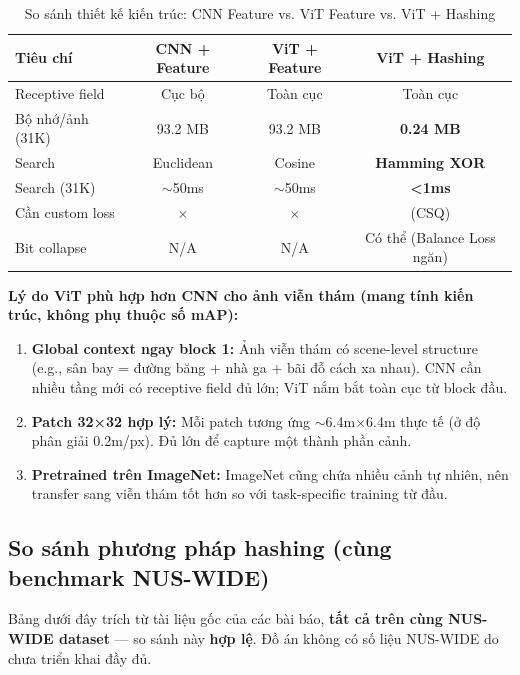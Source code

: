 \documentclass[13pt,a4paper]{article}
\newcommand{\tmark}{\checkmark}
\newcommand{\xmark}{$\times$}
\begin{document}
\begin{table}[H]
\centering
\caption{So sánh thiết kế kiến trúc: CNN Feature vs. ViT Feature vs. ViT + Hashing}
\label{tab:arch_comparison}
\begin{tabular}{lccc}
\toprule
\textbf{Tiêu chí} & \textbf{CNN + Feature} & \textbf{ViT + Feature} & \textbf{ViT + Hashing} \\
\midrule
Receptive field     & Cục bộ      & Toàn cục    & Toàn cục \\
Bộ nhớ/ảnh (31K)   & 93.2 MB     & 93.2 MB     & \textbf{0.24 MB} \\
Search             & Euclidean   & Cosine      & \textbf{Hamming XOR} \\
Search (31K)       & $\sim$50ms  & $\sim$50ms  & \textbf{<1ms} \\
Cần custom loss    & \xmark      & \xmark      & \tmark (CSQ) \\
Bit collapse       & N/A         & N/A         & Có thể (Balance Loss ngăn) \\
\bottomrule
\end{tabular}
\end{table}

\textbf{Lý do ViT phù hợp hơn CNN cho ảnh viễn thám (mang tính kiến trúc, không phụ thuộc số mAP):}
\begin{enumerate}
    \item \textbf{Global context ngay block 1:} Ảnh viễn thám có scene-level structure (e.g., sân bay = đường băng + nhà ga + bãi đỗ cách xa nhau). CNN cần nhiều tầng mới có receptive field đủ lớn; ViT nắm bắt toàn cục từ block đầu.
    \item \textbf{Patch 32×32 hợp lý:} Mỗi patch tương ứng $\sim$6.4m$\times$6.4m thực tế (ở độ phân giải 0.2m/px). Đủ lớn để capture một thành phần cảnh.
    \item \textbf{Pretrained trên ImageNet:} ImageNet cũng chứa nhiều cảnh tự nhiên, nên transfer sang viễn thám tốt hơn so với task-specific training từ đầu.
\end{enumerate}


\subsection{So sánh phương pháp hashing (cùng benchmark NUS-WIDE)}

Bảng dưới đây trích từ tài liệu gốc của các bài báo, \textbf{tất cả trên cùng NUS-WIDE dataset} --- so sánh này \textbf{hợp lệ}. Đồ án không có số liệu NUS-WIDE do chưa triển khai đầy đủ.
\end{document}

